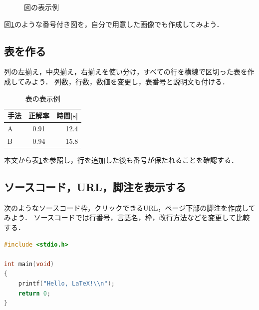 \documentclass[a4paper,11pt]{jsarticle}
\begin{document}
\begin{figure}[H]
  \centering
  \caption{図の表示例}
  \label{fig:exercise-figure}
\end{figure}

図\ref{fig:exercise-figure}のような番号付き図を，自分で用意した画像でも作成してみよう．

\subsection{表を作る}

列の左揃え，中央揃え，右揃えを使い分け，すべての行を横線で区切った表を作成してみよう．
列数，行数，数値を変更し，表番号と説明文も付ける．

\begin{table}[H]
  \centering
  \caption{表の表示例}
  \label{tab:exercise-table}
  \begin{tabular}{|l|c|r|}
    \hline
    手法 & 正解率 & 時間[s] \\
    \hline
    A & 0.91 & 12.4 \\
    \hline
    B & 0.94 & 15.8 \\
    \hline
  \end{tabular}
\end{table}

本文から表\ref{tab:exercise-table}を参照し，行を追加した後も番号が保たれることを確認する．

\subsection{ソースコード，URL，脚注を表示する}

次のようなソースコード枠，クリックできるURL，ページ下部の脚注を作成してみよう．
ソースコードでは行番号，言語名，枠，改行方法などを変更して比較する．

\begin{lstlisting}[language=C]
#include <stdio.h>

int main(void)
{
    printf("Hello, LaTeX!\\n");
    return 0;
}
\end{lstlisting}
\end{document}
